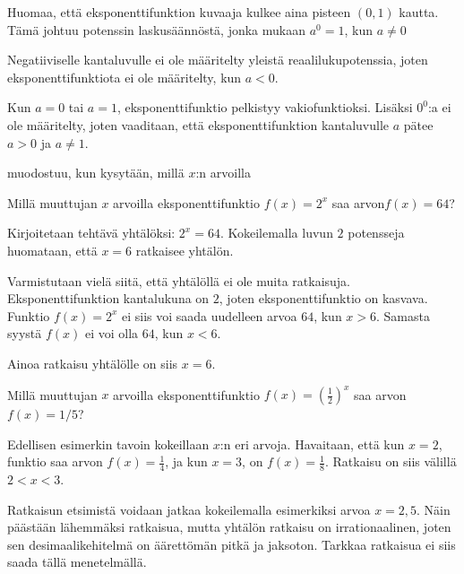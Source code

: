 Huomaa, että eksponenttifunktion kuvaaja kulkee aina pisteen $(0,1)$ kautta. Tämä johtuu potenssin laskusäännöstä, jonka mukaan $a^0=1$, kun $a\neq0$

Negatiiviselle kantaluvulle ei ole määritelty yleistä reaalilukupotenssia, joten eksponenttifunktiota ei ole määritelty, kun $a < 0$. 

Kun $a=0$ tai $a=1$, eksponenttifunktio pelkistyy vakiofunktioksi. Lisäksi $0^0$:a ei ole määritelty, joten vaaditaan, että eksponenttifunktion kantaluvulle $a$ pätee $a>0$ ja $a \neq 1$.

 muodostuu, kun kysytään, millä $x$:n arvoilla %

\begin{esimerkki}
Millä muuttujan $x$ arvoilla eksponenttifunktio $f(x) = 2^x$ saa arvon$f(x) = 64$?
	\begin{esimratk}
Kirjoitetaan tehtävä yhtälöksi: $2^x = 64$. Kokeilemalla luvun $2$ potensseja huomataan, että $x = 6$ ratkaisee yhtälön.

Varmistutaan vielä siitä, että yhtälöllä ei ole muita ratkaisuja. Eksponenttifunktion kantalukuna on $2$, joten eksponenttifunktio on kasvava. Funktio $f(x) = 2^x$ ei siis voi saada uudelleen arvoa $64$, kun $x > 6$. Samasta syystä $f(x)$ ei voi olla $64$, kun $x < 6$.

Ainoa ratkaisu yhtälölle on siis $x = 6$.
	\end{esimratk}
\end{esimerkki}

\begin{esimerkki}
Millä muuttujan $x$ arvoilla eksponenttifunktio $f(x) = \left( \frac{1}{2} \right)^x$ saa arvon $f(x) = 1/5$?

	\begin{esimratk}
Edellisen esimerkin tavoin kokeillaan $x$:n eri arvoja. Havaitaan, että kun $x = 2$, funktio saa arvon $f(x) = \frac{1}{4}$, ja kun $x = 3$, on $f(x) = \frac{1}{8}$. Ratkaisu on siis välillä $2 < x < 3$.

Ratkaisun etsimistä voidaan jatkaa kokeilemalla esimerkiksi arvoa $x = 2,5$. Näin päästään lähemmäksi ratkaisua, mutta yhtälön ratkaisu on irrationaalinen, joten sen desimaalikehitelmä on äärettömän pitkä ja jaksoton. Tarkkaa ratkaisua ei siis saada tällä menetelmällä.
	\end{esimratk}
\end{esimerkki}

